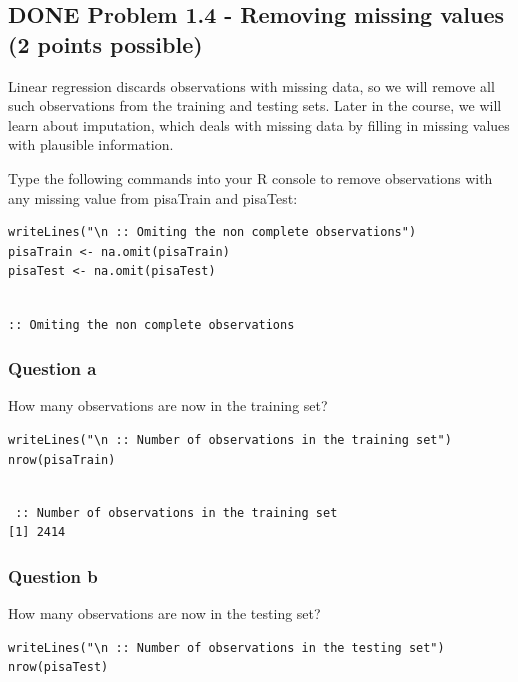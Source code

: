 \documentclass[letterpaper, 9pt, onecolumn, twoside, technote, final]{IEEEtran}
\begin{document}
\subsection{{\bfseries\sffamily DONE} Problem 1.4 - Removing missing values (2 points possible)}
\label{sec-2-4}
Linear regression discards observations with missing data, so we will
remove all such observations from the training and testing sets. Later
in the course, we will learn about imputation, which deals with
missing data by filling in missing values with plausible information.

Type the following commands into your R console to remove observations
with any missing value from pisaTrain and pisaTest:

\begin{verbatim}
writeLines("\n :: Omiting the non complete observations")
pisaTrain <- na.omit(pisaTrain)
pisaTest <- na.omit(pisaTest)
\end{verbatim}

\begin{verbatim}

:: Omiting the non complete observations
\end{verbatim}

\subsubsection{Question a}
\label{sec-2-4-1}

How many observations are now in the training set?

\begin{verbatim}
writeLines("\n :: Number of observations in the training set")
nrow(pisaTrain)
\end{verbatim}

\begin{verbatim}

 :: Number of observations in the training set
[1] 2414
\end{verbatim}

\subsubsection{Question b}
\label{sec-2-4-2}

How many observations are now in the testing set?

\begin{verbatim}
writeLines("\n :: Number of observations in the testing set")
nrow(pisaTest)
\end{verbatim}
\end{document}

